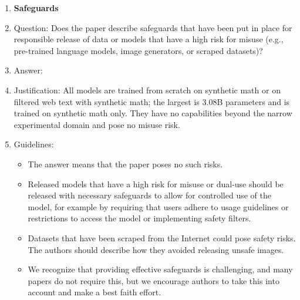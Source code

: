 \documentclass{article}
\begin{document}
\begin{enumerate}
\item {\bf Safeguards}
    \item[] Question: Does the paper describe safeguards that have been put in place for responsible release of data or models that have a high risk for misuse (e.g., pre-trained language models, image generators, or scraped datasets)?
    \item[] Answer: \answerNA{}
    \item[] Justification: All models are trained from scratch on synthetic math or on filtered web text with synthetic math; the largest is 3.08B parameters and is trained on synthetic math only. They have no capabilities beyond the narrow experimental domain and pose no misuse risk.
    \item[] Guidelines:
    \begin{itemize}
        \item The answer \answerNA{} means that the paper poses no such risks.
        \item Released models that have a high risk for misuse or dual-use should be released with necessary safeguards to allow for controlled use of the model, for example by requiring that users adhere to usage guidelines or restrictions to access the model or implementing safety filters.
        \item Datasets that have been scraped from the Internet could pose safety risks. The authors should describe how they avoided releasing unsafe images.
        \item We recognize that providing effective safeguards is challenging, and many papers do not require this, but we encourage authors to take this into account and make a best faith effort.
    \end{itemize}


\end{enumerate}
\end{document}

